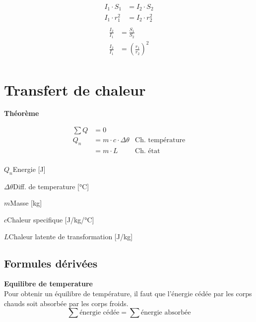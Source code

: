 \documentclass[12pt,a4paper]{article} %
\begin{document}
\begin{twocols}[0.5][0.5]
	\begin{align*}
		I_1 \cdot S_1 &= I_2 \cdot S_2 \\
		I_1 \cdot r_1^2 &= I_2 \cdot r_2^2	\\
	\end{align*}
\nextcol
	\begin{align*}
		\frac{I_2}{I_1} &= \frac{S_1}{S_2} \\
		\frac{I_2}{I_1} &= \left(\frac{r_1}{r_2}\right)^2 \\
	\end{align*}
\end{twocols}
\section{Transfert de chaleur}

\begin{mdframed}
	{\large\bfseries Théorème} \\
	\begin{twocols}
		\begin{align*}
			\sum Q &= 0 \\[1em]
			Q_n &= m \cdot c \cdot \Delta\theta & \text{Ch. température} \\
			&= m \cdot L & \text{Ch. état} \\
		\end{align*}
	\nextcol
		\begin{vardef}
			\item{$Q_n$}{Energie [J]}
			\item{$\Delta\theta$}{Diff. de temperature [°C]}
			\item{$m$}{Masse [kg]}
			\item{$c$}{Chaleur specifique [J/kg/°C]}
			\item{$L$}{Chaleur latente de transformation [J/kg]}
		\end{vardef}
	\end{twocols}
\end{mdframed}

\subsection{Formules dérivées}

{\bfseries Equilibre de temperature} \\
Pour obtenir un équilibre de température, il faut que l'énergie cédée par les corps chauds soit absorbée par les corps froids.
\[\sum \text{énergie cédée} = \sum \text{énergie absorbée}\]
\end{document}
